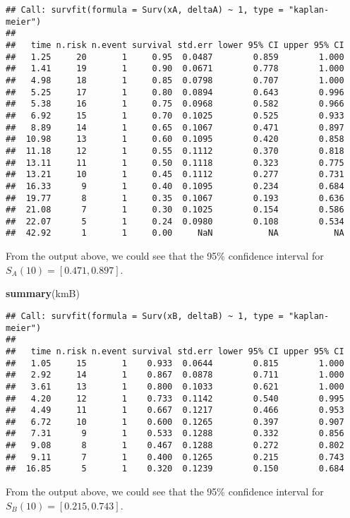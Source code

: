 \documentclass[]{article}
\newenvironment{Shaded}{\begin{snugshade}}{\end{snugshade}}
\newcommand{\KeywordTok}[1]{\textcolor[rgb]{0.13,0.29,0.53}{\textbf{#1}}}
\newcommand{\NormalTok}[1]{#1}
\begin{document}
\begin{verbatim}
## Call: survfit(formula = Surv(xA, deltaA) ~ 1, type = "kaplan-meier")
## 
##   time n.risk n.event survival std.err lower 95% CI upper 95% CI
##   1.25     20       1     0.95  0.0487        0.859        1.000
##   1.41     19       1     0.90  0.0671        0.778        1.000
##   4.98     18       1     0.85  0.0798        0.707        1.000
##   5.25     17       1     0.80  0.0894        0.643        0.996
##   5.38     16       1     0.75  0.0968        0.582        0.966
##   6.92     15       1     0.70  0.1025        0.525        0.933
##   8.89     14       1     0.65  0.1067        0.471        0.897
##  10.98     13       1     0.60  0.1095        0.420        0.858
##  11.18     12       1     0.55  0.1112        0.370        0.818
##  13.11     11       1     0.50  0.1118        0.323        0.775
##  13.21     10       1     0.45  0.1112        0.277        0.731
##  16.33      9       1     0.40  0.1095        0.234        0.684
##  19.77      8       1     0.35  0.1067        0.193        0.636
##  21.08      7       1     0.30  0.1025        0.154        0.586
##  22.07      5       1     0.24  0.0980        0.108        0.534
##  42.92      1       1     0.00     NaN           NA           NA
\end{verbatim}

From the output above, we could see that the 95\% confidence interval
for \(S_A(10) = [0.471, 0.897]\).

\begin{Shaded}
\begin{Highlighting}[]
\KeywordTok{summary}\NormalTok{(kmB)}
\end{Highlighting}
\end{Shaded}

\begin{verbatim}
## Call: survfit(formula = Surv(xB, deltaB) ~ 1, type = "kaplan-meier")
## 
##   time n.risk n.event survival std.err lower 95% CI upper 95% CI
##   1.05     15       1    0.933  0.0644        0.815        1.000
##   2.92     14       1    0.867  0.0878        0.711        1.000
##   3.61     13       1    0.800  0.1033        0.621        1.000
##   4.20     12       1    0.733  0.1142        0.540        0.995
##   4.49     11       1    0.667  0.1217        0.466        0.953
##   6.72     10       1    0.600  0.1265        0.397        0.907
##   7.31      9       1    0.533  0.1288        0.332        0.856
##   9.08      8       1    0.467  0.1288        0.272        0.802
##   9.11      7       1    0.400  0.1265        0.215        0.743
##  16.85      5       1    0.320  0.1239        0.150        0.684
\end{verbatim}

From the output above, we could see that the 95\% confidence interval
for \(S_B(10) = [0.215, 0.743]\).
\end{document}
